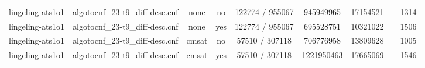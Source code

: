 \begin{appendices}
\begin{table}[p]
\begin{center}
\begin{tabular}{l|cccccccc}
  lingeling-ats1o1               & algotocnf\_23-t9\_diff-desc.cnf & none       & no    & 122774 / 955067 & 945949965 & 17154521  &            & 1314 \\ %
  lingeling-ats1o1               & algotocnf\_23-t9\_diff-desc.cnf & none       & yes   & 122774 / 955067 & 695528751 & 10321022  &            & 1506 \\ %
  lingeling-ats1o1               & algotocnf\_23-t9\_diff-desc.cnf & cmsat      & no    & 57510 / 307118 & 706776958 & 13809628  &            & 1005 \\ %
  lingeling-ats1o1               & algotocnf\_23-t9\_diff-desc.cnf & cmsat      & yes   & 57510 / 307118 & 1221950463 & 17665069  &            & 1546 \\ %
    \end{tabular}
  \end{center}
\end{table}

\newpage


\end{appendices}
